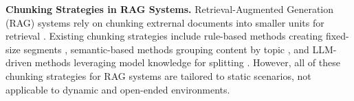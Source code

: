 \noindent \textbf{Chunking Strategies in RAG Systems.}
Retrieval-Augmented Generation (RAG) systems rely on chunking extrernal documents into smaller units for retrieval \citep{DBLP:conf/nips/LewisPPPKGKLYR020, gao2023retrieval}. 
Existing chunking strategies include rule-based methods creating fixed-size segments \citep{DBLP:conf/nips/LewisPPPKGKLYR020, DBLP:conf/iclr/SarthiATKGM24, Edge2024FromLT, DBLP:conf/nips/GutierrezS0Y024}, semantic-based methods grouping content by topic \citep{DBLP:conf/naacl/QuTB25}, and LLM-driven methods leveraging model knowledge for splitting \citep{DBLP:conf/iclr/PanWJLCL0LZQ025, DBLP:conf/emnlp/DuarteMGF0O24, Zhao2024MetaChunkingLT, DBLP:conf/ecir/LiuSC25}. 
However, all of these chunking strategies for RAG systems are tailored to static scenarios, not applicable to dynamic and open-ended environments.
